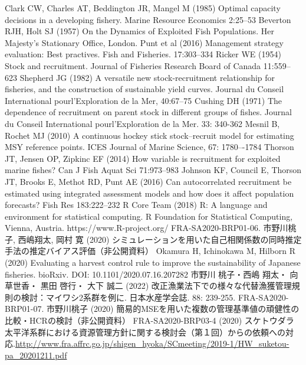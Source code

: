 \documentclass[11pt]{jsarticle}
\begin{document}
\begin{thebibliography}{9}
   Clark CW, Charles AT, Beddington JR, Mangel M (1985) Optimal capacity decisions in a developing fishery. Marine Resource Economics 2:25--53
   Beverton RJH, Holt SJ (1957) On the Dynamics of Exploited Fish Populations. Her Majesty’s Stationary Office, London.
   Punt et al (2016) Management strategy evaluation: Best practives. Fish and Fisheries. 17:303--334
   Ricker WE (1954) Stock and recruitment. Journal of Fisheries Research Board of Canada 11:559--623
   Shepherd JG (1982) A versatile new stock-recruitment relationship for fisheries, and the construction of sustainable yield curves. Journal du Conseil International pourl'Exploration de la Mer, 40:67--75
   Cushing DH (1971) The dependence of recruitment on parent stock in different groups of fishes. Journal du Conseil International pourl'Exploration de la Mer. 33: 340-362
   Mesnil B, Rochet MJ (2010) A continuous hockey stick stock–recruit model for estimating MSY reference points. ICES Journal of Marine Science, 67: 1780–-1784
 Thorson JT, Jensen OP, Zipkinc EF (2014) How variable is recruitment for exploited marine fishes? Can J Fish Aquat Sci 71:973--983
 Johnson KF, Council E, Thorson JT, Brooks E, Methot RD, Punt AE (2016) Can autocorrelated recruitment be estimated using integrated assessment models and how does it affect population forecasts? Fish Res 183:222--232
 R Core Team (2018) R: A language and environment for statistical computing. R Foundation for Statistical Computing, Vienna, Austria. https://www.R-project.org/
 FRA-SA2020-BRP01-06. 市野川桃子, 西嶋翔太, 岡村 寛 (2020) シミュレーションを用いた自己相関係数の同時推定手法の推定バイアス評価（非公開資料）
 Okamura H, Ichinokawa M, Hilborn R (2020) Evaluating a harvest control rule to improve the sustainability of Japanese fisheries. bioRxiv. DOI: 10.1101/2020.07.16.207282
 市野川 桃子・西嶋 翔太・ 向 草世香・ 黒田 啓行・ 大下 誠二 (2022) 改正漁業法下での様々な代替漁獲管理規則の検討：マイワシ2系群を例に. 日本水産学会誌. 88: 239-255.
 FRA-SA2020-BRP01-07. 市野川桃子 (2020) 簡易的MSEを用いた複数の管理基準値の頑健性の比較・HCRの検討（非公開資料）
 FRA-SA2020-BRP03-4 (2020) スケトウダラ太平洋系群における資源管理方針に関する検討会（第１回）からの依頼への対応.\url{http://www.fra.affrc.go.jp/shigen_hyoka/SCmeeting/2019-1/HW_suketou-pa_20201211.pdf}


\end{thebibliography}
\end{document}
